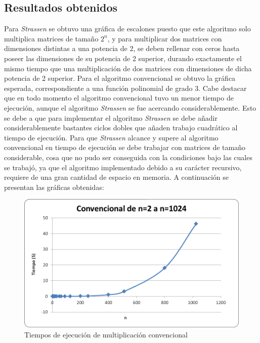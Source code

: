 \documentclass[12pt,letterpaper]{article}
\begin{document}
\subsection{Resultados obtenidos}
Para \textit{Strassen} se obtuvo una gráfica de escalones puesto que este algoritmo solo multiplica matrices de tamaño $2^n$, y para multiplicar dos matrices con dimensiones distintas a una potencia de 2, se deben rellenar con ceros hasta poseer las dimensiones de su potencia de 2 superior, durando exactamente el mismo tiempo que una multiplicación de dos matrices con dimensiones de dicha potencia de 2 superior. Para el algoritmo convencional se obtuvo la gráfica esperada, correspondiente a una función polinomial de grado 3.
Cabe destacar que en todo momento el algoritmo convencional tuvo un menor tiempo de ejecución, aunque el algoritmo \textit{Strassen} se fue acercando considerablemente. Esto se debe a que para implementar el algoritmo \textit{Strassen} se debe añadir considerablemente bastantes ciclos dobles que añaden trabajo cuadrático al tiempo de ejecución. Para que \textit{Strassen} alcance y supere al algoritmo convencional en tiempo de ejecución se debe trabajar con matrices de tamaño considerable, cosa que no pudo ser conseguida con la condiciones bajo las cuales se trabajó, ya que el algoritmo implementado debido a su carácter recursivo, requiere de una gran cantidad de espacio en memoria. A continuación se presentan las gráficas obtenidas:
\begin{figure}[H]
	\centering
	\includegraphics[scale=0.6]{c2-1024.png}
	\caption{Tiempos de ejecución de multiplicación convencional}
	\label{fig:tiempoC}
\end{figure}
\end{document}
